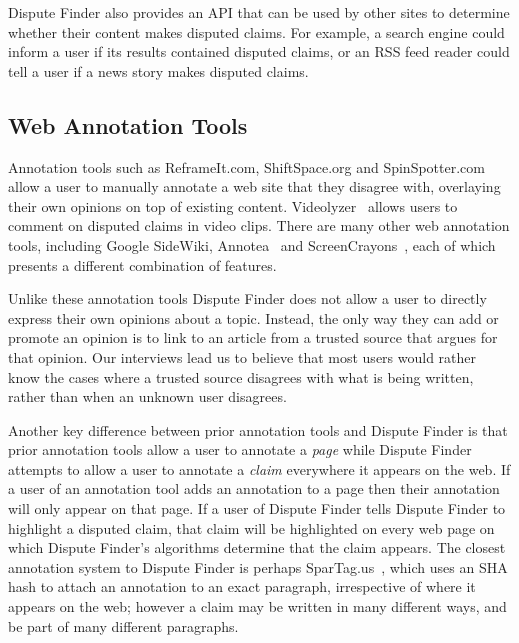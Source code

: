 \documentclass{www2010-submission}
\newcommand{\todo}[1]{}
\begin{document}
\todo{Try using a fainter color}

\todo{Text is wrong in the screenshot}

Dispute Finder also provides an API that can be used by other sites to determine whether their content makes disputed claims. For example, a search engine could inform a user if its results contained disputed claims, or an RSS feed reader could tell a user if a news story makes disputed claims.

\todo{Document API online}
\todo{Change the highlight color to yellow? Auto-adjust highlight color based on background color?}
\todo{Should we automatically adjust the highlight color, based on the background color of the page}
\todo{Discuss previous work on highlighting here, rather than in related work?}


\subsection{Web Annotation Tools}

Annotation tools such as ReframeIt.com, ShiftSpace.org and SpinSpotter.com allow a user to manually annotate a web site that they disagree with, overlaying their own opinions on top of existing content. Videolyzer~\cite{Diakopoulos2008} allows users to comment on disputed claims in video clips. There are many other web annotation tools, including Google SideWiki, Annotea~\cite{Koivunen2001} and ScreenCrayons~\cite{Olsen2004}, each of which presents a different combination of features.

Unlike these annotation tools Dispute Finder does not allow a user to directly express their own opinions about a topic. Instead, the only way they can add or promote an opinion is to link to an article from a trusted source that argues for that opinion. Our interviews lead us to believe that most users would rather know the cases where a trusted source disagrees with what is being written, rather than when an unknown user disagrees.

Another key difference between prior annotation tools and Dispute Finder is that prior annotation tools allow a user to annotate a {\it page} while Dispute Finder attempts to allow a user to annotate a {\it claim} everywhere it appears on the web. If a user of an annotation tool adds an annotation to a page then their annotation will only appear on that page. If a user of Dispute Finder tells Dispute Finder to highlight a disputed claim, that claim will be highlighted on every web page on which Dispute Finder's algorithms determine that the claim appears. The closest annotation system to Dispute Finder is perhaps SparTag.us~\cite{Hong2009}, which uses an SHA hash to attach an annotation to an exact paragraph, irrespective of where it appears on the web; however a claim may be written in many different ways, and be part of many different paragraphs.
\end{document}
